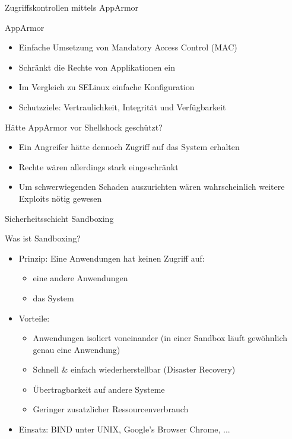\begin{frame}{Zugriffskontrollen mittels AppArmor}
  \begin{block}{AppArmor}
    \begin{itemize}[<+->]
      \item Einfache Umsetzung von Mandatory Access Control (MAC)
      \item Schränkt die Rechte von Applikationen ein
      \item Im Vergleich zu SELinux einfache Konfiguration
      \item Schutzziele: Vertraulichkeit, Integrität und Verfügbarkeit
    \end{itemize}
  \end{block}

  \begin{block}{Hätte AppArmor vor Shellshock geschützt?}
    \begin{itemize}[<+->]
      \item Ein Angreifer hätte dennoch Zugriff auf das System erhalten
      \item Rechte wären allerdings stark eingeschränkt
      \item Um schwerwiegenden Schaden auszurichten wären wahrscheinlich weitere Exploits nötig gewesen
    \end{itemize}
  \end{block}
\end{frame}

\begin{frame}{Sicherheitsschicht Sandboxing}
  \begin{block}{Was ist Sandboxing?}
    \begin{itemize}[<+->]
      \item Prinzip: Eine Anwendungen hat keinen Zugriff auf:
      \begin{itemize}[<+->]
        \item eine andere Anwendungen
        \item das System
      \end{itemize}
      \item Vorteile:
      \begin{itemize}[<+->]
        \item Anwendungen isoliert voneinander (in einer Sandbox läuft gewöhnlich genau eine Anwendung)
        \item Schnell \& einfach wiederherstellbar (Disaster Recovery)
        \item Übertragbarkeit auf andere Systeme
        \item Geringer zusatzlicher Ressourcenverbrauch
      \end{itemize}
      \item Einsatz: BIND unter UNIX, Google's Browser Chrome, ...
    \end{itemize}
  \end{block}
\end{frame}

